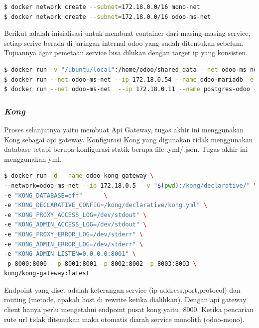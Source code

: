 \begin{lstlisting}[style=mystyle, language=sh, caption={Shell Script untuk pembuatan jaringan }]
$ docker network create --subnet=172.18.0.0/16 mono-net
$ docker network create --subnet=172.18.0.0/16 odoo-ms-net	
\end{lstlisting} 

Berikut adalah inisialisasi untuk membuat container dari masing-masing service, setiap serive berada di jaringan internal odoo yang sudah ditentukan sebelum. Tujuannya agar pemetaan service bisa dilukan dengan target ip yang konsisten.

\begin{lstlisting}[style=mystyle, language=sh, caption={Shell Script untuk pembuatan container }]
$ docker run -v "/ubuntu/local":/home/odoo/shared_data --net odoo-ms-net  --ip 172.18.0.55 --name odoo-mono -p :8069  -d odoo-mono
$ docker run --net odoo-ms-net --ip 172.18.0.54 --name odoo-mariadb -e MYSQL_ROOT_PASSWORD=mariadb -p 3306:3306 -d mariadb 
$ docker run --net odoo-ms-net  --ip 172.18.0.11 --name postgres-odoo -e POSTGRES_PASSWORD=postgres -p 5432:5432 -d postgres
\end{lstlisting} 

\subsubsection{\textit{Kong}}
Proses selanjutnya yaitu membuat Api Gateway, tugas akhir ini menggunakan Kong sebagai api gateway. Konfigurasi Kong yang digunakan tidak menggunakan database tetapi berupa konfigurasi statik berupa file .yml/.json. Tugas akhir ini menggunakan yml.

\begin{lstlisting}[style=mystyle, language=sh, caption={Shell Script untuk pembuatan container }]
$ docker run -d --name odoo-kong-gateway \
--network=odoo-ms-net --ip 172.18.0.5  -v "$(pwd):/kong/declarative/" \
-e "KONG_DATABASE=off" 		\
-e "KONG_DECLARATIVE_CONFIG=/kong/declarative/kong.yml" \
-e "KONG_PROXY_ACCESS_LOG=/dev/stdout" \
-e "KONG_ADMIN_ACCESS_LOG=/dev/stdout" \		
-e "KONG_PROXY_ERROR_LOG=/dev/stderr" \
-e "KONG_ADMIN_ERROR_LOG=/dev/stderr" \
-e "KONG_ADMIN_LISTEN=0.0.0.0:8001" \
-p 8000:8000  -p 8001:8001 -p 8002:8002 -p 8003:8003 \
kong/kong-gateway:latest 
\end{lstlisting} 

Endpoint yang diset adalah keterangan service (ip address,port,protocol) dan routing (metode, apakah host di rewrite ketika dialihkan). Dengan api gateway client hanya perlu mengetahui endpoint pusat kong yaitu :8000. Ketika pencarian rute url tidak ditemukan maka otomatis diarah service monolith (odoo-mono).

